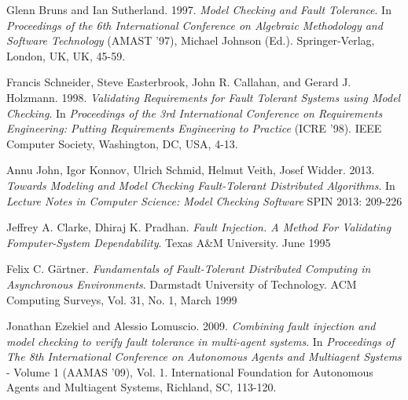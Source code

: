 \documentclass{llncs2e/llncs}
\begin{document}
\begin{thebibliography}{9}
 Glenn Bruns and Ian Sutherland. 1997. \emph{Model Checking and Fault Tolerance}. In \emph{Proceedings of the 6th International Conference on Algebraic Methodology and Software Technology} (AMAST '97), Michael Johnson (Ed.). Springer-Verlag, London, UK, UK, 45-59. 

 Francis Schneider, Steve Easterbrook, John R. Callahan, and Gerard J. Holzmann. 1998. \emph{Validating Requirements for Fault Tolerant Systems using Model Checking}. In \emph{Proceedings of the 3rd International Conference on Requirements Engineering: Putting Requirements Engineering to Practice} (ICRE '98). IEEE Computer Society, Washington, DC, USA, 4-13. 

 Annu John, Igor Konnov, Ulrich Schmid, Helmut Veith, Josef Widder. 2013. \emph{Towards Modeling and Model Checking Fault-Tolerant Distributed Algorithms}. In \emph{Lecture Notes in Computer Science: Model Checking Software} SPIN 2013: 209-226

 Jeffrey A. Clarke, Dhiraj K. Pradhan. \emph{Fault Injection. A Method For
Validating Fomputer-System Dependability}. Texas A\&M University. June 1995

 Felix C. G\"{a}rtner. \emph{Fundamentals of Fault-Tolerant Distributed Computing in Asynchronous Environments}. Darmstadt University of Technology. ACM Computing Surveys, Vol. 31, No. 1, March 1999

 Jonathan Ezekiel and Alessio Lomuscio. 2009. \emph{Combining fault injection and model checking to verify fault tolerance in multi-agent systems}. In \emph{Proceedings of The 8th International Conference on Autonomous Agents and Multiagent Systems} - Volume 1 (AAMAS '09), Vol. 1. International Foundation for Autonomous Agents and Multiagent Systems, Richland, SC, 113-120. 

\end{thebibliography}
\end{document}
